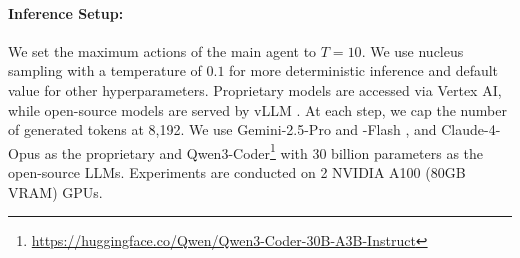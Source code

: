 \paragraph{Inference Setup:} We set the maximum actions of the main agent to $T = 10$. We use nucleus sampling \citep{Holtzman2020The} with a temperature of $0.1$ for more deterministic inference and default value for other hyperparameters. Proprietary models are accessed via Vertex AI, while open-source models are served by vLLM \cite{10.1145/3600006.3613165}. At each step, we cap the number of generated tokens at 8,192. We use Gemini-2.5-Pro and -Flash \citep{comanici2025gemini25pushingfrontier}, and Claude-4-Opus \citep{anthropic2025claude4} as the proprietary and Qwen3-Coder\footnote{\url{https://huggingface.co/Qwen/Qwen3-Coder-30B-A3B-Instruct}} with 30 billion parameters \citep{qwen3technicalreport} as the open-source LLMs. Experiments are conducted on 2 NVIDIA A100 (80GB VRAM) GPUs.

        
        
        
        
